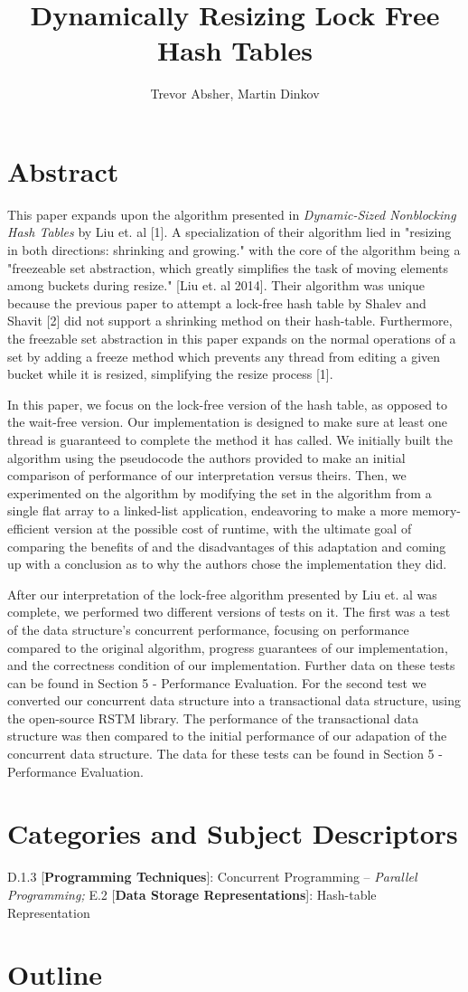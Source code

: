 \documentclass[11pt]{article} %
\title{Dynamically Resizing Lock Free Hash Tables}
\author{Trevor Absher, Martin Dinkov}
\begin{document}
\maketitle

\section{Abstract}

This paper expands upon the algorithm presented in \textit{Dynamic-Sized Nonblocking Hash Tables} by Liu et. al [1]. A specialization of their algorithm lied in "resizing in both directions: shrinking and growing." with the core of the algorithm being a "freezeable set abstraction, which greatly simplifies the task of moving elements among buckets during resize." [Liu et. al 2014]. Their algorithm was unique because the previous paper to attempt a lock-free hash table by Shalev and Shavit [2]  did not support a shrinking method on their hash-table. Furthermore, the freezable set abstraction in this paper expands on the normal operations of a set by adding a freeze method which prevents any thread from editing a given bucket while it is resized, simplifying the resize process [1].

In this paper, we focus on the lock-free version of the hash table, as opposed to the wait-free version. Our implementation is designed to make sure at least one thread is guaranteed to complete the method it has called. We initially built the algorithm using the pseudocode the authors provided to make an initial comparison of performance of our interpretation versus theirs. Then, we experimented on the algorithm by modifying the set in the algorithm from a single flat array to a linked-list application, endeavoring to make a more memory-efficient version at the possible cost of runtime, with the ultimate goal of comparing the benefits of and the disadvantages of this adaptation and coming up with a conclusion as to why the authors chose the implementation they did.

After our interpretation of the lock-free algorithm presented by Liu et. al was complete, we performed two different versions of tests on it. The first was a test of the data structure's concurrent performance, focusing on performance compared to the original algorithm, progress guarantees of our implementation, and the correctness condition of our implementation. Further data on these tests can be found in Section 5 - Performance Evaluation. For the second test we converted our concurrent data structure into a transactional data structure, using the open-source RSTM library. The performance of the transactional data structure was then compared to the initial performance of our adapation of the concurrent data structure. The data for these tests can be found in Section 5 - Performance Evaluation. 


\section{Categories and Subject Descriptors}

D.1.3 [\textbf{Programming Techniques}]: Concurrent Programming -- \textit{Parallel Programming;} E.2 [\textbf{Data Storage Representations}]: Hash-table Representation

\section{Outline}
\end{document}
